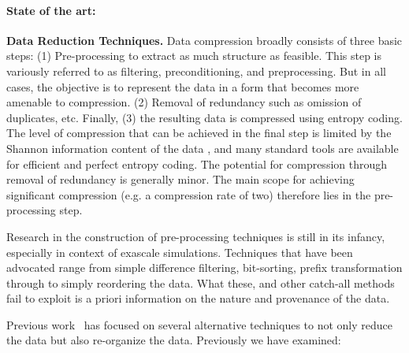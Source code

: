 \paragraph{State of the art:} {\bf Data Reduction Techniques.} Data compression
broadly consists of three basic steps: (1) Pre-processing to extract as much
structure as feasible. This step is variously referred to as filtering,
preconditioning, and preprocessing. But in all cases, the objective is to
represent the data in a form that becomes more amenable to compression.  (2)
Removal of redundancy such as omission of duplicates, etc.  Finally, (3) the
resulting data is compressed using entropy coding. The level of compression
that can be achieved in the final step is limited by the Shannon information
content of the data \cite{Gray:book}, and many standard tools are available for
efficient and perfect entropy coding. The potential for compression through
removal of redundancy is generally minor. The main scope for achieving
significant compression (e.g. a compression rate of two) therefore
lies in the pre-processing step.

Research in the construction of pre-processing techniques is still in its
infancy, especially in context of exascale simulations. Techniques that have
been advocated range from simple difference filtering, bit-sorting, prefix
transformation through to simply reordering the data.  What these, and other
catch-all methods fail to exploit is a priori information on the nature and
provenance of the data. 

Previous
work~\cite{lakshminarasimhan2011compressing,%
gong2012multi,jenkins2012byte,gong2013parlo,boyuka2014transparent,%
tang2014improving, sato2014user}
has focused on several alternative techniques to not only reduce the data
but also re-organize the data. Previously we have examined:



